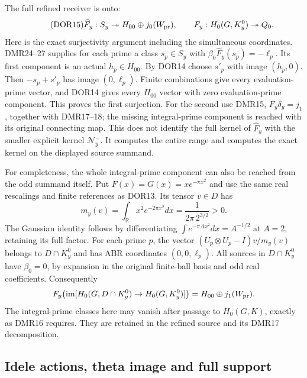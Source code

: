 The full refined receiver is onto:
\begin{equation}\tag{DOR15}
\widehat F_y:S_y\twoheadrightarrow H_{00}\oplus j_0(W_{\rm pr}),
\qquad
F_y:H_0(G,K_y^0)\twoheadrightarrow Q_0.
\end{equation}
Here is the exact surjectivity argument including the simultaneous
coordinates. DMR24--27 supplies for each prime a class $s_p\in S_y$
with $\beta_0\widehat F_y(s_p)=-\ell_p$. Its first component is an
actual $h_p\in H_{00}$. By DOR14 choose $s'_p$ with image $(h_p,0)$.
Then $-s_p+s'_p$ has image $(0,\ell_p)$. Finite combinations give
every evaluation-prime vector, and DOR14 gives every $H_{00}$
vector with zero evaluation-prime component. This proves the first
surjection. For the second use DMR15,
$F_y\delta_y=j_1$, together with DMR17--18; the missing integral-prime
component is reached with its original connecting map. This does
not identify the full kernel of $\widehat F_y$ with the smaller
explicit kernel $\mathcal N_y^-$. It computes the entire range and
computes the exact kernel on the displayed source summand.

For completeness, the whole integral-prime component can also be
reached from the odd summand itself. Put $F(x)=G(x)=xe^{-\pi x^2}$
and use the same real rescalings and finite references as DOR13.
Its tensor $v\in D$ has
\begin{equation}\tag{DOR16}
m_y(v)=\int_{\mathbb R}x^2e^{-2\pi x^2}dx
       =\frac1{2\pi\,2^{3/2}}>0.
\end{equation}
The Gaussian identity follows by differentiating
$\int e^{-\pi A x^2}dx=A^{-1/2}$ at $A=2$, retaining its full
factor. For each prime $p$, the vector
$(U_p\otimes U_p-I)v/m_y(v)$ belongs to $D\cap K_y^0$ and has
ABR coordinates $(0,0,\ell_p)$. All sources in $D\cap K_y^0$
have $\beta_0=0$, by expansion in the original finite-ball basis
and odd real coefficients. Consequently
\[
F_y\bigl(\operatorname{im}[H_0(G,D\cap K_y^0)
                  \to H_0(G,K_y^0)]\bigr)
=H_{00}\oplus j_1(W_{\rm pr}).
\]
The integral-prime classes here may vanish after passage to
$H_0(G,K)$, exactly as DMR16 requires. They are retained in the
refined source and its DMR17 decomposition.

\subsection{Idele actions, theta image and full support}

